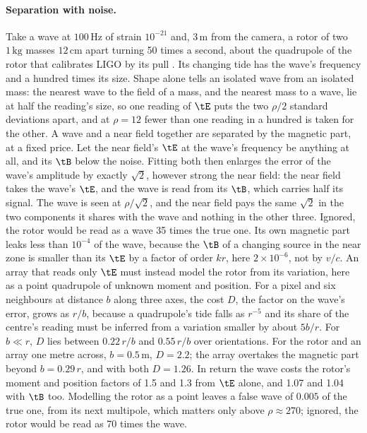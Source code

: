 \paragraph{Separation with noise.} Take a wave at $100\,\mathrm{Hz}$ of strain
$10^{-21}$ and, $3\,\mathrm{m}$ from the camera, a rotor of two
$1\,\mathrm{kg}$ masses $12\,\mathrm{cm}$ apart turning 50 times a second,
about the quadrupole of the rotor that calibrates LIGO by its pull
\cite{Ross2021}. Its changing tide has the wave's frequency and a hundred times
its size. Shape alone tells an isolated wave from an isolated mass: the nearest
wave to the field of a mass, and the nearest mass to a wave, lie at half the
reading's size, so one reading of $\tE$ puts the two $\rho/2$ standard
deviations apart, and at $\rho = 12$ fewer than one reading in a hundred is
taken for the other. A wave and a near field together are separated by the
magnetic part, at a fixed price. Let the near field's $\tE$ at the wave's
frequency be anything at all, and its $\tB$ below the noise. Fitting both then
enlarges the error of the wave's amplitude by exactly $\sqrt2$, however strong
the near field: the near field takes the wave's $\tE$, and the wave is read from
its $\tB$, which carries half its signal. The wave is seen at $\rho/\sqrt2$, and
the near field pays the same $\sqrt2$ in the two components it shares with the
wave and nothing in the other three. Ignored, the rotor would be read as a wave
35 times the true one. Its own magnetic part leaks less than $10^{-4}$ of the
wave, because the $\tB$ of a changing source in the near zone is smaller than
its $\tE$ by a factor of order $kr$, here $2\times10^{-6}$, not by $v/c$. An
array that reads only $\tE$ must instead model the rotor from its variation,
here as a point quadrupole of unknown moment and position. For a pixel and six
neighbours at distance $b$ along three axes, the cost $D$, the factor on the
wave's error, grows as $r/b$, because a quadrupole's tide falls as $r^{-5}$ and
its share of the centre's reading must be inferred from a variation smaller by
about $5b/r$. For $b \ll r$, $D$ lies between $0.22\,r/b$ and $0.55\,r/b$ over
orientations. For the rotor and an array one metre across, $b = 0.5\,\mathrm{m}$,
$D = 2.2$; the array overtakes the magnetic part beyond $b = 0.29\,r$, and with
both $D = 1.26$. In return the wave costs the rotor's moment and position
factors of 1.5 and 1.3 from $\tE$ alone, and 1.07 and 1.04 with $\tB$ too.
Modelling the rotor as a point leaves a false wave of $0.005$ of the true one,
from its next multipole, which matters only above $\rho \approx 270$; ignored,
the rotor would be read as 70 times the wave.

